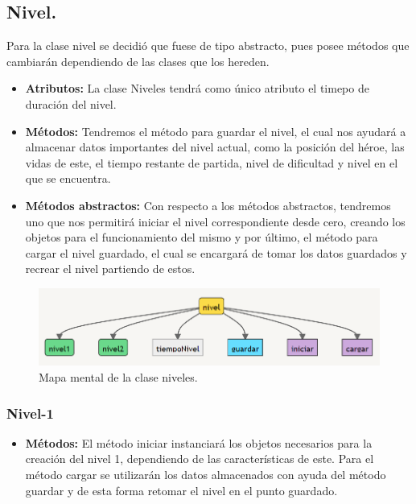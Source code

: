 \documentclass{article}
\begin{document}
\subsection{Nivel.}\label{niveles}
Para la clase nivel se decidió que fuese de tipo abstracto, pues posee métodos que cambiarán dependiendo de las clases que los hereden.
\begin{itemize}
  \item \textbf{Atributos:} La clase Niveles tendrá como único atributo el timepo de duración del nivel.
  
  \item \textbf{Métodos:} Tendremos el método para guardar el nivel, el cual nos ayudará a almacenar datos importantes del nivel actual, como la posición del héroe, las vidas de este, el tiempo restante de partida, nivel de dificultad y nivel en el que se encuentra.
  
  \item \textbf{Métodos abstractos:}  Con respecto a los métodos abstractos, tendremos uno que nos permitirá iniciar el nivel correspondiente desde cero, creando los objetos para el funcionamiento del mismo y por último, el método para cargar el nivel guardado, el cual se encargará de tomar los datos guardados y recrear el nivel partiendo de estos. 
  
\end{itemize}

\begin{figure}[h]
\includegraphics[scale=0.8]{Images/niveles.png}
\centering
\caption{Mapa mental de la clase niveles.}
\label{fig:mmniveles}
\end{figure}

    \subsubsection{Nivel-1}
    \begin{itemize}
        \item \textbf{Métodos:} El método iniciar instanciará los objetos necesarios para la creación del nivel 1, dependiendo de las características de este. Para el método cargar se utilizarán los datos almacenados con ayuda del método guardar y de esta forma retomar el nivel en el punto guardado.
    \end{itemize} 
    
\end{document}
